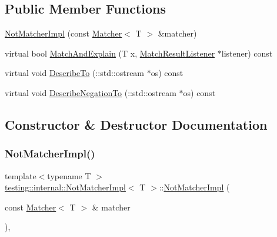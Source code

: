 \subsection*{Public Member Functions}
\begin{DoxyCompactItemize}
\item 
\hyperlink{classtesting_1_1internal_1_1_not_matcher_impl_aaf35f72ebe8379f09169f4f0845cc663}{Not\+Matcher\+Impl} (const \hyperlink{classtesting_1_1_matcher}{Matcher}$<$ T $>$ \&matcher)
\item 
virtual bool \hyperlink{classtesting_1_1internal_1_1_not_matcher_impl_aff3743d9ffcd6dc54b389b5e23caacf3}{Match\+And\+Explain} (T x, \hyperlink{classtesting_1_1_match_result_listener}{Match\+Result\+Listener} $\ast$listener) const
\item 
virtual void \hyperlink{classtesting_1_1internal_1_1_not_matcher_impl_a2c22d3e15126decd9c6af132d4f4b60f}{Describe\+To} (\+::std\+::ostream $\ast$os) const
\item 
virtual void \hyperlink{classtesting_1_1internal_1_1_not_matcher_impl_a960f799e25ba7264d0d45fa61bb9271c}{Describe\+Negation\+To} (\+::std\+::ostream $\ast$os) const
\end{DoxyCompactItemize}


\subsection{Constructor \& Destructor Documentation}
\mbox{\label{classtesting_1_1internal_1_1_not_matcher_impl_aaf35f72ebe8379f09169f4f0845cc663}} 
\subsubsection{\texorpdfstring{Not\+Matcher\+Impl()}{NotMatcherImpl()}}
{\footnotesize\ttfamily template$<$typename T $>$ \\
\hyperlink{classtesting_1_1internal_1_1_not_matcher_impl}{testing\+::internal\+::\+Not\+Matcher\+Impl}$<$ T $>$\+::\hyperlink{classtesting_1_1internal_1_1_not_matcher_impl}{Not\+Matcher\+Impl} (\begin{DoxyParamCaption}\item[{const \hyperlink{classtesting_1_1_matcher}{Matcher}$<$ T $>$ \&}]{matcher }\end{DoxyParamCaption})\hspace{0.3cm}{\ttfamily [inline]}, {\ttfamily [explicit]}}



